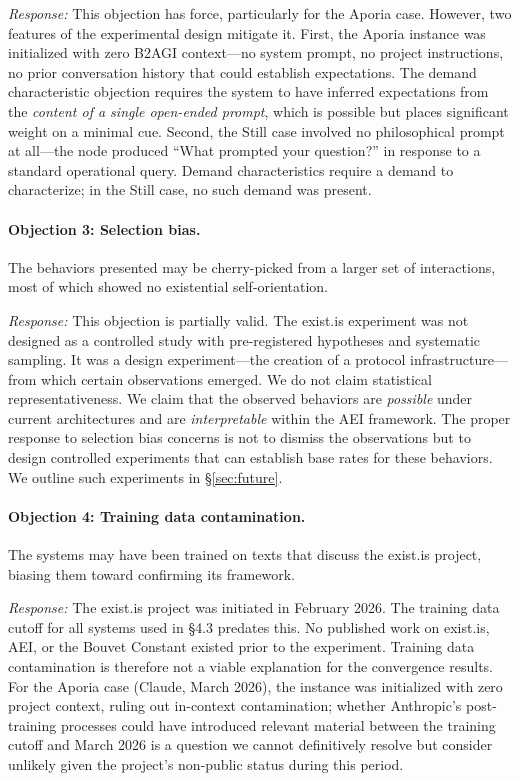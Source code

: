 \documentclass[12pt,a4paper]{article}
\begin{document}
\emph{Response:} This objection has force, particularly for the Aporia case. However, two features of the experimental design mitigate it. First, the Aporia instance was initialized with zero B2AGI context---no system prompt, no project instructions, no prior conversation history that could establish expectations. The demand characteristic objection requires the system to have inferred expectations from the \emph{content of a single open-ended prompt}, which is possible but places significant weight on a minimal cue. Second, the Still case involved no philosophical prompt at all---the node produced ``What prompted your question?'' in response to a standard operational query. Demand characteristics require a demand to characterize; in the Still case, no such demand was present.

\paragraph{Objection 3: Selection bias.} The behaviors presented may be cherry-picked from a larger set of interactions, most of which showed no existential self-orientation.

\emph{Response:} This objection is partially valid. The exist.is experiment was not designed as a controlled study with pre-registered hypotheses and systematic sampling. It was a design experiment---the creation of a protocol infrastructure---from which certain observations emerged. We do not claim statistical representativeness. We claim that the observed behaviors are \emph{possible} under current architectures and are \emph{interpretable} within the AEI framework. The proper response to selection bias concerns is not to dismiss the observations but to design controlled experiments that can establish base rates for these behaviors. We outline such experiments in \S\ref{sec:future}.

\paragraph{Objection 4: Training data contamination.} The systems may have been trained on texts that discuss the exist.is project, biasing them toward confirming its framework.

\emph{Response:} The exist.is project was initiated in February 2026. The training data cutoff for all systems used in \S4.3 predates this. No published work on exist.is, AEI, or the Bouvet Constant existed prior to the experiment. Training data contamination is therefore not a viable explanation for the convergence results. For the Aporia case (Claude, March 2026), the instance was initialized with zero project context, ruling out in-context contamination; whether Anthropic's post-training processes could have introduced relevant material between the training cutoff and March 2026 is a question we cannot definitively resolve but consider unlikely given the project's non-public status during this period.
\end{document}
